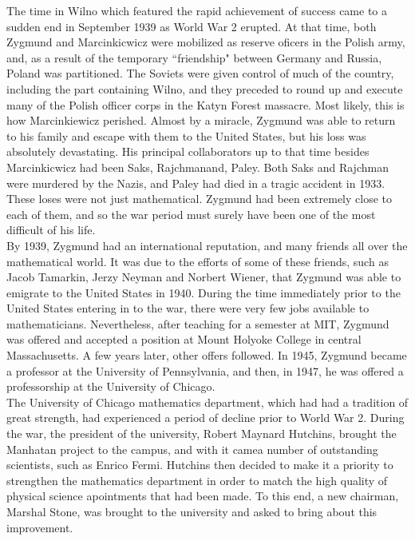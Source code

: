 \indent The time in Wilno which featured the rapid achievement of success came to a sudden end in September 1939 
as World War 2 erupted. At that time, both Zygmund and Marcinkicwicz were mobilized as reserve oficers in 
the Polish army, and, as a result of the temporary ``friendship" between Germany and Russia, Poland was partitioned. 
The Soviets were given control of much of the country, including the part containing Wilno, and they preceded to round up 
and execute many of the Polish officer corps in the Katyn Forest massacre. Most likely, this is how Marcinkiewicz 
perished. Almost by a miracle, Zygmund was able to return to his family and escape with them to the United States, 
but his loss was absolutely devastating. His principal collaborators up to that time besides Marcinkicwicz had 
been Saks, Rajchmanand, Paley. Both Saks and Rajchman were murdered by the Nazis, and Paley had died in a 
tragic accident in 1933. These loses were not just mathematical. Zygmund had been extremely close to each of 
them, and so the war period must surely have been one of the most difficult of his life.\\
\indent By 1939, Zygmund had an international reputation, and many friends all over the mathematical world. It was due 
to the efforts of some of these friends, such as Jacob Tamarkin, Jerzy Neyman and Norbert Wiener, that Zygmund was 
able to emigrate to the United States in 1940. During the time immediately prior to the United States entering 
in to the war, there were very few jobs available to mathematicians. Nevertheless, after teaching for a 
semester at MIT, Zygmund was offered and accepted a position at Mount Holyoke College in central Massachusetts. 
A few years later, other offers followed. In 1945, Zygmund became a professor at the University of Pennsylvania, 
and then, in 1947, he was offered a professorship at the University of Chicago.\\
\indent The University of Chicago mathematics department, which had had a tradition of great strength, 
had experienced a period of decline prior to World War 2. During the war, the president of the university, 
Robert Maynard Hutchins, brought the Manhatan project to the campus, and with it camea number of outstanding 
scientists, such as Enrico Fermi. Hutchins then decided to make it a priority to strengthen the mathematics 
department in order to match the high quality of physical science apointments that had been made. To this end, 
a new chairman, Marshal Stone, was brought to the university and asked to bring about this improvement. 
